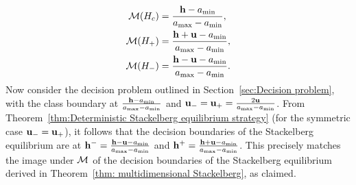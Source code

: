 \begin{equation*}
\begin{aligned}
    \mathcal{M}(H_c) &= \frac{\mathbf{h} - a_{\min}}{a_{\max}-a_{\min}}, \\
    \mathcal{M}(H_+) &= \frac{\mathbf{h} + \mathbf{u} - a_{\min}}{a_{\max}-a_{\min}}, \\
    \mathcal{M}(H_-) &= \frac{\mathbf{h} - \mathbf{u} - a_{\min}}{a_{\max}-a_{\min}}.
\end{aligned}
\end{equation*}
Now consider the decision problem outlined in Section~\ref{sec:Decision problem}, with the class boundary at $\frac{\mathbf{h} - a_{\min}}{a_{\max}-a_{\min}}$ and $\mathbf{u_-} = \mathbf{u_+} = \frac{2\mathbf{u}}{a_{\max}-a_{\min}}$. From Theorem~\ref{thm:Deterministic Stackelberg equilibrium strategy} (for the symmetric case $\mathbf{u_-} = \mathbf{u_+}$), it follows that the decision boundaries of the Stackelberg equilibrium are at $\mathbf{h^{-}} = \frac{\mathbf{h} - \mathbf{u} - a_{\min}}{a_{\max}-a_{\min}}$ and $\mathbf{h^{+}} = \frac{\mathbf{h} + \mathbf{u} - a_{\min}}{a_{\max}-a_{\min}}$. This precisely matches the image under $\mathcal{M}$ of the decision boundaries of the Stackelberg equilibrium derived in Theorem~\ref{thm: multidimensional Stackelberg}, as claimed.

